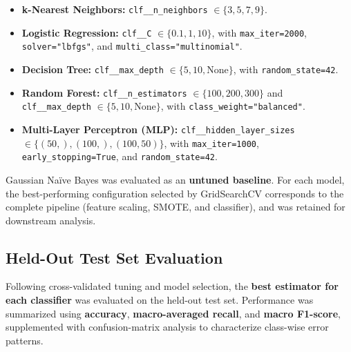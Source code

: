 \documentclass[sigconf]{acmart}
\begin{document}
\begin{itemize}
    \item \textbf{k-Nearest Neighbors:}
    \texttt{clf\_\_\allowbreak n\_\allowbreak neighbors} $\in \{3, 5, 7, 9\}$.

    \item \textbf{Logistic Regression:}
    \texttt{clf\_\_\allowbreak C} $\in \{0.1, 1, 10\}$, with
    \texttt{max\_\allowbreak iter=2000},
    \texttt{solver=\allowbreak"lbfgs"}, and
    \texttt{multi\_\allowbreak class=\allowbreak"multinomial"}.

    \item \textbf{Decision Tree:}
    \texttt{clf\_\_\allowbreak max\_\allowbreak depth} $\in \{5, 10, \text{None}\}$, with
    \texttt{random\_\allowbreak state=42}.

    \item \textbf{Random Forest:}
    \texttt{clf\_\_\allowbreak n\_\allowbreak estimators} $\in \{100, 200, 300\}$ and
    \texttt{clf\_\_\allowbreak max\_\allowbreak depth} $\in \{5, 10, \text{None}\}$, with
    \texttt{class\_\allowbreak weight=\allowbreak"balanced"}.

    \item \textbf{Multi-Layer Perceptron (MLP):}
    \texttt{clf\_\_\allowbreak hidden\_\allowbreak layer\_\allowbreak sizes} $\in \{(50,), (100,), (100, 50)\}$, with
    \texttt{max\_\allowbreak iter=1000},
    \texttt{early\_\allowbreak stopping=\allowbreak True}, and
    \texttt{random\_\allowbreak state=42}.
\end{itemize}

Gaussian Naïve Bayes was evaluated as an \textbf{untuned baseline}. For each model, the best-performing configuration selected by GridSearchCV corresponds to the complete pipeline (feature scaling, SMOTE, and classifier), and was retained for downstream analysis.

\subsection{Held-Out Test Set Evaluation}
\label{subsec:test_eval}

Following cross-validated tuning and model selection, the \textbf{best estimator for each classifier} was evaluated on the held-out test set. Performance was summarized using \textbf{accuracy}, \textbf{macro-averaged recall}, and \textbf{macro F1-score}, supplemented with confusion-matrix analysis to characterize class-wise error patterns.
\end{document}
